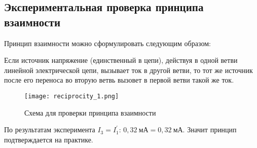\subsection{Экспериментальная проверка принципа взаимности}

Принцип взаимности можно сформулировать следующим образом:

Если источник напряжение (единственный в цепи),
действуя в одной ветви линейной электрической цепи,
вызывает ток в другой ветви, то тот же источник после его
переноса во вторую ветвь вызовет в первой ветви такой же ток.

\begin{figure}[!h]
    \centering
    \texttt{[image: reciprocity\_1.png]}
    \caption{Схема для проверки принципа взаимности}
\end{figure}

По результатам эксперимента $I_3=I_1^\prime$: $0,32\ \text{мА} = 0,32\ \text{мА}$.
Значит принцип подтверждается на практике.

